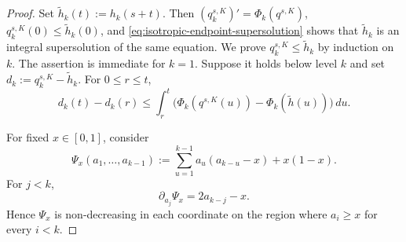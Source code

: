 \documentclass[11pt,a4paper]{amsart}
\theoremstyle{remark}
\begin{document}
\begin{proof}
Set $\widetilde h_k(t):=h_k(s+t)$. Then
$(q_k^{s,K})'=\Phi_k(q^{s,K})$,
$q_k^{s,K}(0)\leq\widetilde h_k(0)$, and
\eqref{eq:isotropic-endpoint-supersolution} shows that
$\widetilde h_k$ is an integral supersolution of the same equation.
We prove $q_k^{s,K}\leq\widetilde h_k$ by induction on $k$. The assertion
is immediate for $k=1$.
Suppose it holds below level $k$ and set
$d_k:=q_k^{s,K}-\widetilde h_k$. For $0\leq r\leq t$,
\[
d_k(t)-d_k(r)
\leq
\int_r^t
\bigl(\Phi_k(q^{s,K}(u))-\Phi_k(\widetilde h(u))\bigr)\,du.
\]

For fixed \(x\in[0,1]\), consider
\[
        \Psi_x(a_1,\ldots,a_{k-1})
        :=
        \sum_{u=1}^{k-1}a_u(a_{k-u}-x)+x(1-x).
\]
For \(j<k\),
\[
        \partial_{a_j}\Psi_x
        =2a_{k-j}-x.
\]
Hence \(\Psi_x\) is non-decreasing in each coordinate on the region
where \(a_i\geq x\) for every \(i<k\).


\end{proof}
\end{document}

